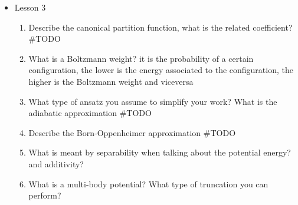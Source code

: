 {\begin{itemize}
\begin{enumerate}
        \item How is the value of a macroscopic observable normally obtained? (through a time average ...)
        \item To what a time average can be converted? what is a phase space average?
        \item When is a stochastic process is called ergodic? relating to or denoting systems or processes with the property that, given sufficient time, they include or impinge on all points in a given space and can be represented statistically by a reasonably large selection of points
        \item How do we obtain a microcanonical ensamble? N, V, E #TODO
        \item What are Poisson brackets? When is a quantity conserved? (tuckerman)
        \item What does the Liouville theorem say? It says that as the systems contained in a tiny region of phase space evolve according to classical mechanics, the volume they occupy remains constant. #TODO explain why
        \item When is the average of a quantity constant in time?
        \item How can you write the average of that quantity in a microcanonical ensemble?
        \item What is a partition function? what type of coefficient it has? (case of microcanonical ensemble) #TODO
        \item Formula for entropy in the microcanonical ensamble
    \end{enumerate}
    \item Lesson 3
    \begin{enumerate}
        \item Describe the canonical partition function, what is the related coefficient? #TODO
        \item What is a Boltzmann weight? it is the probability of a certain configuration, the lower is the energy associated to the configuration, the higher is the Boltzmann weight and viceversa
        \item What type of ansatz you assume to simplify your work? What is the adiabatic approximation #TODO
        \item Describe the Born-Oppenheimer approximation #TODO
        \item What is meant by separability when talking about the potential energy? and additivity?
        \item What is a multi-body potential? What type of truncation you can perform?

\end{enumerate}
\end{itemize}}
